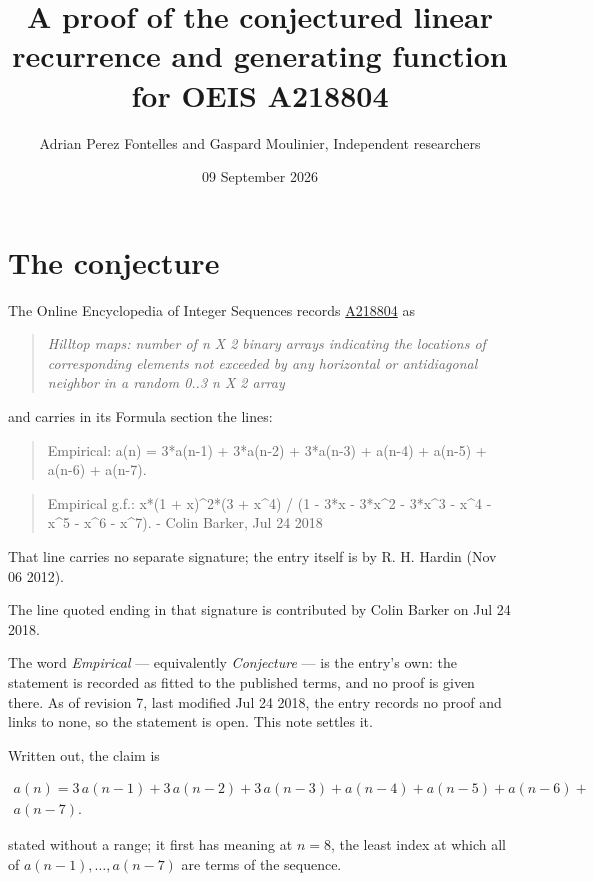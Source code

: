 \documentclass[11pt]{article}
\title{A proof of the conjectured linear recurrence and generating function for OEIS A218804}
\author{Adrian Perez Fontelles and Gaspard Moulinier, Independent researchers}
\date{09 September 2026}
\theoremstyle{definition}
\begin{document}
\maketitle
\section{The conjecture}

The Online Encyclopedia of Integer Sequences records \href{https://oeis.org/A218804}{A218804} as

\begin{quote}\itshape Hilltop maps: number of n X 2 binary arrays indicating the locations of corresponding elements not exceeded by any horizontal or antidiagonal neighbor in a random 0..3 n X 2 array\end{quote}

and carries in its Formula section the lines:

\begin{quote}\ttfamily Empirical: a(n) = 3*a(n-1) + 3*a(n-2) + 3*a(n-3) + a(n-4) + a(n-5) + a(n-6) + a(n-7).\end{quote}

\begin{quote}\ttfamily Empirical g.f.: x*(1 + x)\textasciicircum{}2*(3 + x\textasciicircum{}4) / (1 - 3*x - 3*x\textasciicircum{}2 - 3*x\textasciicircum{}3 - x\textasciicircum{}4 - x\textasciicircum{}5 - x\textasciicircum{}6 - x\textasciicircum{}7). - Colin Barker, Jul 24 2018\end{quote}

That line carries no separate signature; the entry itself is by R. H. Hardin (Nov 06 2012).

The line quoted ending in that signature is contributed by Colin Barker on Jul 24 2018.

The word {\itshape Empirical} --- equivalently {\itshape Conjecture} --- is the entry's own: the statement is recorded as fitted to the published terms, and no proof is given there. As of revision 7, last modified Jul 24 2018, the entry records no proof and links to none, so the statement is open. This note settles it.

Written out, the claim is

\begin{multline*} a(n) = 3\,a(n-1) + 3\,a(n-2) + 3\,a(n-3) + a(n-4) + a(n-5) + a(n-6) + \\ a(n-7). \end{multline*}

stated without a range; it first has meaning at $n = 8$, the least index at which all of $a(n-1),\dots,a(n-7)$ are terms of the sequence.
\end{document}
